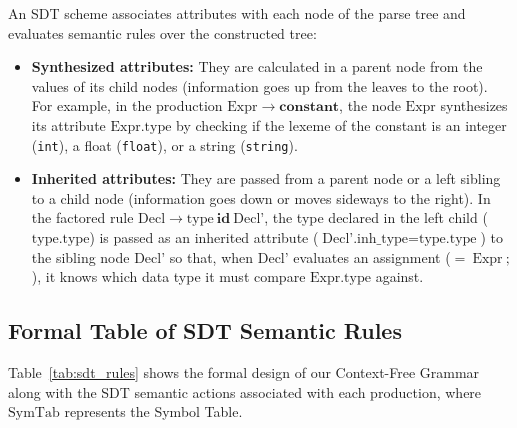 \documentclass[letterpaper,12pt,oneside]{article}
\begin{document}
An SDT scheme associates attributes with each node of the parse tree and evaluates semantic rules over the constructed tree:
\begin{itemize}
    \item \textbf{Synthesized attributes:} They are calculated in a parent node from the values of its child nodes (information goes up from the leaves to the root). For example, in the production $\text{Expr} \to \mathbf{constant}$, the node $\text{Expr}$ synthesizes its attribute $\text{Expr.type}$ by checking if the lexeme of the constant is an integer (\texttt{int}), a float (\texttt{float}), or a string (\texttt{string}).
    \item \textbf{Inherited attributes:} They are passed from a parent node or a left sibling to a child node (information goes down or moves sideways to the right). In the factored rule $\text{Decl} \to \text{type} \ \mathbf{id} \ \text{Decl'}$, the type declared in the left child ($\text{type.type}$) is passed as an inherited attribute ($\text{Decl'.inh\_type} = \text{type.type}$) to the sibling node $\text{Decl'}$ so that, when $\text{Decl'}$ evaluates an assignment ($\mathbf{=} \ \text{Expr} \ \mathbf{;}$), it knows which data type it must compare $\text{Expr.type}$ against.
\end{itemize}

\subsection{Formal Table of SDT Semantic Rules}
Table~\ref{tab:sdt_rules} shows the formal design of our Context-Free Grammar along with the SDT semantic actions associated with each production, where $\text{SymTab}$ represents the Symbol Table.
\end{document}
